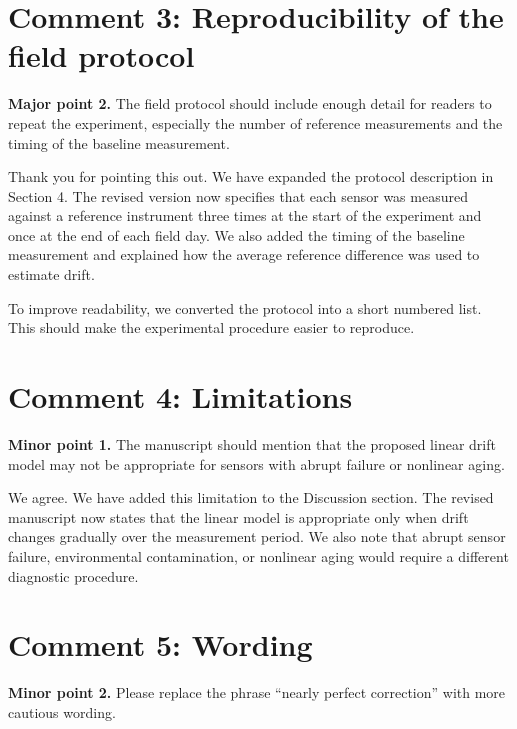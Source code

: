 \section*{Comment 3: Reproducibility of the field protocol}
\begin{refereecomment}
\textbf{Major point 2.} The field protocol should include enough detail for readers to repeat the experiment, especially the number of reference measurements and the timing of the baseline measurement.
\end{refereecomment}

\begin{authorreply}
Thank you for pointing this out. We have expanded the protocol description in Section 4. The revised version now specifies that each sensor was measured against a reference instrument three times at the start of the experiment and once at the end of each field day. We also added the timing of the baseline measurement and explained how the average reference difference was used to estimate drift.

To improve readability, we converted the protocol into a short numbered list. This should make the experimental procedure easier to reproduce.
\end{authorreply}

\section*{Comment 4: Limitations}
\begin{refereecomment}
\textbf{Minor point 1.} The manuscript should mention that the proposed linear drift model may not be appropriate for sensors with abrupt failure or nonlinear aging.
\end{refereecomment}

\begin{authorreply}
We agree. We have added this limitation to the Discussion section. The revised manuscript now states that the linear model is appropriate only when drift changes gradually over the measurement period. We also note that abrupt sensor failure, environmental contamination, or nonlinear aging would require a different diagnostic procedure.
\end{authorreply}

\section*{Comment 5: Wording}
\begin{refereecomment}
\textbf{Minor point 2.} Please replace the phrase ``nearly perfect correction'' with more cautious wording.
\end{refereecomment}

